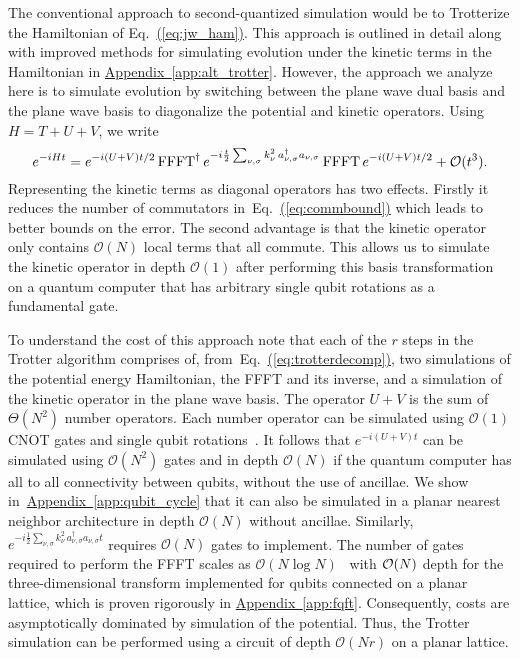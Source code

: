 \documentclass[superscriptaddress,aps,pra,nofootinbib,notitlepage,10pt,longbibliography]{revtex4-1}
\newcommand{\eq}[1]{Eq.~\hyperref[eq:#1]{(\ref*{eq:#1})}}
\DeclareRobustCommand{\app}[1]{\hyperref[app:#1]{Appendix~\ref*{app:#1}}}
\begin{document}
The conventional approach to second-quantized simulation would be to Trotterize the Hamiltonian of \eq{jw_ham}. This approach is outlined in detail along with improved methods for simulating evolution under the kinetic terms in the Hamiltonian in \app{alt_trotter}. However, the approach we analyze here is to simulate evolution by switching between the plane wave dual basis and the plane wave basis to diagonalize the potential and kinetic operators. Using $H= T + U + V$, we write
\begin{equation}
e^{-iHt}=e^{-i(U+V)t/2} \, {\rm FFFT}^\dagger \, e^{-i\frac{t}{2} \sum_{\nu, \sigma} k_\nu^2 \, a_{\nu,\sigma}^\dagger a_{\nu,\sigma}}\,{\rm FFFT}\, e^{-i(U+V)t/2} +\mathcal{O}(t^3).\label{eq:trotterdecomp}
\end{equation}
Representing the kinetic terms as diagonal operators has two effects.  Firstly it reduces the number of commutators in~\eq{commbound} which leads to better bounds on the error.  The second advantage is that the kinetic operator only contains $\mathcal{O}(N)$ local terms that all commute.  This allows us to simulate the kinetic operator in depth $\mathcal{O}(1)$ after performing this basis transformation on a quantum computer that has arbitrary single qubit rotations as a fundamental gate. 

To understand the cost of this approach note that each of the $r$ steps in the Trotter algorithm comprises of, from~\eq{trotterdecomp}, two simulations of the potential energy Hamiltonian, the FFFT and its inverse, and a simulation of the kinetic operator in the plane wave basis.  The operator $U+V$ is the sum of $\Theta(N^2)$ number operators. Each number operator can be simulated using $\mathcal{O}(1)$ CNOT gates and single qubit rotations~\cite{Whitfield2010}.  It follows that $e^{-i(U+V)t}$ can be simulated using $\mathcal{O}(N^2)$ gates and in depth $\mathcal{O}(N)$ if the quantum computer has all to all connectivity between qubits, without the use of ancillae.  We show in~\app{qubit_cycle} that it can also be simulated in a planar nearest neighbor architecture in depth $\mathcal{O}(N)$ without ancillae.  Similarly, $e^{-i\frac{1}{2} \sum_{\nu, \sigma} k_\nu^2 \, a_{\nu,\sigma}^\dagger a_{\nu,\sigma}t}$ requires $\mathcal{O}(N)$ gates to implement.  The number of gates required to perform the FFFT scales as $\mathcal{O}(N\log N)$~\cite{Ferris2014,Verstraete2009} with ${\cal O}(N)$ depth for the three-dimensional transform implemented for qubits connected on a planar lattice, which is proven rigorously in \app{fqft}. Consequently, costs are asymptotically dominated by simulation of the potential. Thus, the Trotter simulation can be performed using a circuit of depth $\mathcal{O}(N r)$ on a planar lattice.
\end{document}
